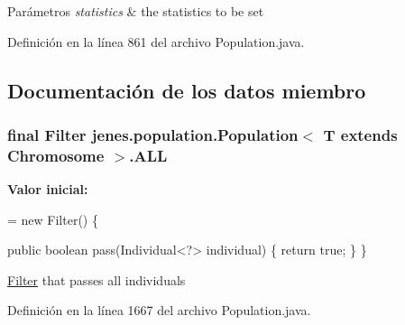 \begin{DoxyParams}{Parámetros}
{\em statistics} & the statistics to be set \\
\hline
\end{DoxyParams}


Definición en la línea 861 del archivo Population.\-java.



\subsection{Documentación de los datos miembro}
\hypertarget{classjenes_1_1population_1_1_population_3_01_t_01extends_01_chromosome_01_4_a5cfea1b7e0a14171b85d3ae7460f0723}{
\subsubsection[{A\-L\-L}]{\setlength{\rightskip}{0pt plus 5cm}final Filter jenes.\-population.\-Population$<$ T extends Chromosome $>$.A\-L\-L\hspace{0.3cm}{\ttfamily [static]}}}\label{classjenes_1_1population_1_1_population_3_01_t_01extends_01_chromosome_01_4_a5cfea1b7e0a14171b85d3ae7460f0723}
{\bfseries Valor inicial\-:}
\begin{DoxyCode}
= \textcolor{keyword}{new} Filter() \{

        \textcolor{keyword}{public} \textcolor{keywordtype}{boolean} pass(Individual<?> individual) \{
            \textcolor{keywordflow}{return} \textcolor{keyword}{true};
        \}
    \}
\end{DoxyCode}
\hyperlink{interfacejenes_1_1population_1_1_population_3_01_t_01extends_01_chromosome_01_4_1_1_filter}{Filter} that passes all individuals 

Definición en la línea 1667 del archivo Population.\-java.

